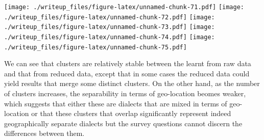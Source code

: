 \documentclass[]{article}
\newenvironment{Shaded}{\begin{snugshade}}{\end{snugshade}}
\newcommand{\KeywordTok}[1]{\textcolor[rgb]{0.13,0.29,0.53}{\textbf{{#1}}}}
\newcommand{\DataTypeTok}[1]{\textcolor[rgb]{0.13,0.29,0.53}{{#1}}}
\newcommand{\DecValTok}[1]{\textcolor[rgb]{0.00,0.00,0.81}{{#1}}}
\newcommand{\StringTok}[1]{\textcolor[rgb]{0.31,0.60,0.02}{{#1}}}
\newcommand{\CommentTok}[1]{\textcolor[rgb]{0.56,0.35,0.01}{\textit{{#1}}}}
\newcommand{\NormalTok}[1]{{#1}}
\begin{document}
\begin{Shaded}
\end{Shaded}

\texttt{[image: ./writeup\_files/figure-latex/unnamed-chunk-71.pdf]}
\texttt{[image: ./writeup\_files/figure-latex/unnamed-chunk-72.pdf]}
\texttt{[image: ./writeup\_files/figure-latex/unnamed-chunk-73.pdf]}
\texttt{[image: ./writeup\_files/figure-latex/unnamed-chunk-74.pdf]}
\texttt{[image: ./writeup\_files/figure-latex/unnamed-chunk-75.pdf]}

We can see that clusters are relatively stable between the learnt from
raw data and that from reduced data, except that in some cases the
reduced data could yield results that merge some distinct clusters. On
the other hand, as the number of clusters increases, the separability in
terms of geo-location beomes weaker, which suggests that either these
are dialects that are mixed in terms of geo-location or that these
clusters that overlap significantly represent indeed geographically
separate dialects but the survey questions cannot discern the
differences between them.
\end{document}
